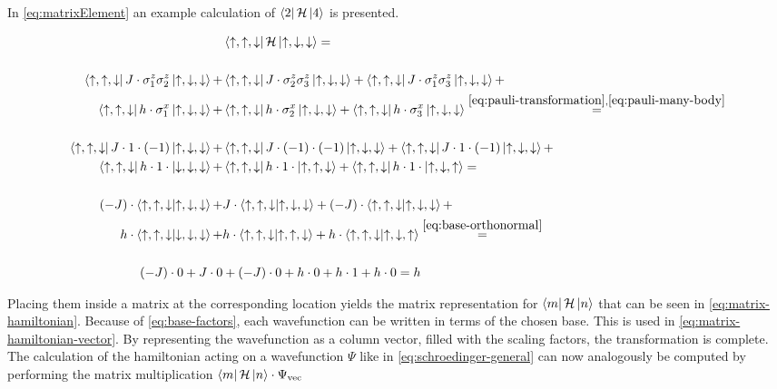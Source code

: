 In \autoref{eq:matrixElement} an example calculation of $\bra{2}\mathcal{H}\ket{4}$ is presented.

\begin{equation}
    \label{eq:matrixElement}
    \begin{split}
        &\bra{\up, \up, \down} \hamiltonian \ket{\up, \down, \down} = \\\\ %
         \bra{\up, \up, \down} J\cdot \sigma^z_1\sigma^z_2 \ket{\up, \down, \down} +
         &\bra{\up, \up, \down} J\cdot \sigma^z_2\sigma^z_3 \ket{\up, \down, \down} +
         \bra{\up, \up, \down} J\cdot \sigma^z_1\sigma^z_3 \ket{\up, \down, \down} +\\
         \bra{\up, \up, \down} h\cdot \sigma^x_1 \ket{\up, \down, \down} +
         &\bra{\up, \up, \down} h\cdot \sigma^x_2 \ket{\up, \down, \down} +
         \bra{\up, \up, \down} h\cdot \sigma^x_3 \ket{\up, \down, \down}\stackrel{\ref{eq:pauli-transformation}, \ref{eq:pauli-many-body}}{=}\\\\ %
          \bra{\up, \up, \down} J\cdot  1 \cdot (-1) \ket{\up, \down, \down} +
         & \bra{\up, \up, \down} J\cdot (-1) \cdot (-1) \ket{\up, \down, \down} +
          \bra{\up, \up, \down} J\cdot  1 \cdot (-1) \ket{\up, \down, \down} +\\
          \bra{\up, \up, \down} h\cdot  1 \cdot \ket{\down, \down, \down} +
         & \bra{\up, \up, \down} h\cdot 1 \cdot \ket{\up, \up, \down} +
          \bra{\up, \up, \down} h\cdot  1 \cdot \ket{\up, \down, \up} =\\\\ %
          (-J)\cdot      \bra{\up, \up, \down}  \ket{\up, \down, \down} +
         & J\cdot        \bra{\up, \up, \down} \ket{\up, \down, \down} +
          (-J)\cdot      \bra{\up, \up, \down}  \ket{\up, \down, \down} +\\
          h\cdot         \bra{\up, \up, \down}  \ket{\down, \down, \down} +
         & h\cdot        \bra{\up, \up, \down} \ket{\up, \up, \down} +
          h\cdot         \bra{\up, \up, \down}  \ket{\up, \down, \up}\stackrel{\ref{eq:base-orthonormal}}{=}\\\\ %
          (-J)\cdot 0 + J\cdot 0 &+  (-J)\cdot 0 + h\cdot 0  + h\cdot 1 + h\cdot 0   = h 
    \end{split}
\end{equation}

Placing them inside a matrix at the corresponding location yields the matrix representation for $\bra{m}\mathcal{H}\ket{n}$ that can be seen in \autoref{eq:matrix-hamiltonian}.
Because of \autoref{eq:base-factors}, each wavefunction can be written in terms of the chosen base. This is used in \autoref{eq:matrix-hamiltonian-vector}. By representing the wavefunction as a column vector, filled with the scaling factors, the transformation is complete. 
The calculation of the hamiltonian \hamiltonian acting on a wavefunction $\Psi$ like in \autoref{eq:schroedinger-general} can now analogously be computed by performing the matrix multiplication $\bra{m}\mathcal{H}\ket{n} \cdot \Psi_\mathrm{vec}$

